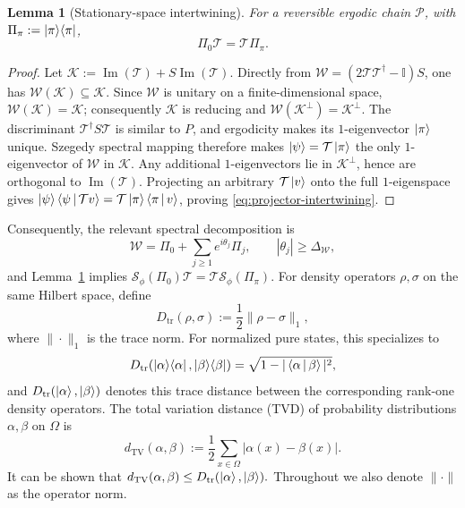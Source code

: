 \documentclass[10pt,conference]{IEEEtran}
\theoremstyle{plain}
\newtheorem{lemma}[theorem]{Lemma}
\theoremstyle{remark}
\renewcommand{\braket}[2]{\Braket{#1 | #2}}
\begin{document}
\begin{lemma}[Stationary-space intertwining]
\label{lem:stationary-intertwining}
For a reversible ergodic chain \(\mathcal P\), with
\(\Pi_\pi:=\ket{\pi}\!\bra{\pi}\),
\begin{equation}
\Pi_0\mathcal T=\mathcal T\Pi_\pi .
\label{eq:projector-intertwining}
\end{equation}
\end{lemma}
\begin{proof}
Let \(\mathcal K:=\operatorname{Im}(\mathcal T)+
S\operatorname{Im}(\mathcal T)\).  Directly from
\(\mathcal W=(2\mathcal T\mathcal T^\dagger-\mathbb I)S\), one has
\(\mathcal W(\mathcal K)\subseteq\mathcal K\).  Since \(\mathcal W\)
is unitary on a finite-dimensional space,
\(\mathcal W(\mathcal K)=\mathcal K\); consequently \(\mathcal K\) is
reducing and \(\mathcal W(\mathcal K^\perp)=\mathcal K^\perp\).
The discriminant
\(\mathcal T^\dagger S\mathcal T\) is similar to \(P\), and
ergodicity makes its \(1\)-eigenvector \(\ket{\pi}\) unique.
Szegedy spectral mapping therefore makes
\(\ket{\psi}=\mathcal T\ket{\pi}\) the only \(1\)-eigenvector of
\(\mathcal W\) in \(\mathcal K\).  Any additional \(1\)-eigenvectors
lie in \(\mathcal K^\perp\), hence are orthogonal to
\(\operatorname{Im}(\mathcal T)\).  Projecting an arbitrary
\(\mathcal T\ket{v}\) onto the full \(1\)-eigenspace gives
\(\ket{\psi}\braket{\psi}{\mathcal T v}
=\mathcal T\ket{\pi}\braket{\pi}{v}\), proving
\eqref{eq:projector-intertwining}.
\end{proof}

Consequently, the relevant spectral decomposition is
\[
\mathcal{W}=\Pi_0+\sum_{j\geq 1}e^{i\theta_j}\Pi_j,
\qquad |\theta_j|\geq \Delta_{\mathcal{W}},
\]
and Lemma~\ref{lem:stationary-intertwining} implies
\(\mathcal S_\phi(\Pi_0)\mathcal T
=\mathcal T\mathcal S_\phi(\Pi_\pi)\).
For density operators \(\rho,\sigma\) on the same Hilbert space,
define
\begin{equation}
D_{\mathrm{tr}}(\rho,\sigma):=\frac12\|\rho-\sigma\|_1,
\end{equation}
where \(\|\cdot\|_1\) is the trace norm.  For normalized pure states,
this specializes to
\begin{equation}
D_{\mathrm{tr}}(\ket{\alpha}\!\bra{\alpha},
\ket{\beta}\!\bra{\beta})
=
\sqrt{1-|\braket{\alpha}{\beta}|^2},
\end{equation}
and \(D_{\mathrm{tr}}(\ket{\alpha},\ket{\beta})\) denotes this trace
distance between the corresponding rank-one density operators.
The total variation distance (TVD) of probability distributions
\(\alpha,\beta\) on \(\Omega\) is
\begin{equation}
d_{\mathrm{TV}}(\alpha,\beta)
:=
\frac{1}{2}\sum_{x\in\Omega}\left|\alpha(x)-\beta(x)\right|.
\end{equation}
It can be shown that $d_{\mathrm{TV}}(\alpha,\beta)
\le
D_{\mathrm{tr}}(\ket{\alpha},\ket{\beta}).$ Throughout we also denote \(\|\cdot\|\) as the operator norm.
\end{document}
